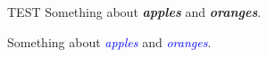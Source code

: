 \documentclass{article}
\newcommand\kw[1]{\textit{\textbf{\itshape #1}}}
\newcommand\kww[1]{\textcolor{blue}{\itshape #1}}
\begin{document}
TEST
Something about \kw{apples} and \kw{oranges}.

Something about \kww{apples} and \kww{oranges}.

\lipsum
\end{document}
